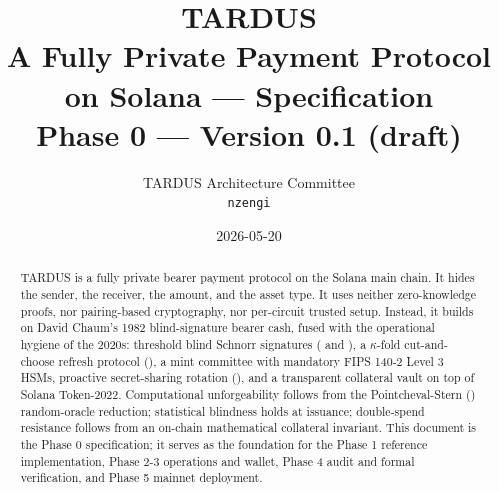 \documentclass[11pt,letterpaper]{article}
\title{
  \vspace{-2em}
  \Huge\textbf{TARDUS} \\[0.8em]
  \Large A Fully Private Payment Protocol \\[0.3em] on Solana --- Specification \\[1.2em]
  \normalsize Phase 0 --- Version 0.1 (draft)
}
\author{
  TARDUS Architecture Committee \\
  \texttt{nzengi}
}
\date{2026-05-20}
\theoremstyle{definition}
\theoremstyle{remark}
\begin{document}
\maketitle
\thispagestyle{empty}

\begin{abstract}
\noindent
TARDUS is a fully private bearer payment protocol on the Solana main chain. It hides the sender, the receiver, the amount, and the asset type. It uses neither zero-knowledge proofs, nor pairing-based cryptography, nor per-circuit trusted setup. Instead, it builds on David Chaum's 1982 blind-signature bearer cash, fused with the operational hygiene of the 2020s: threshold blind Schnorr signatures (\cite{stinson-strobl2001} and \cite{komlo-goldberg2020}), a $\kappa$-fold cut-and-choose refresh protocol (\cite{dold2019}), a mint committee with mandatory FIPS 140-2 Level 3 HSMs, proactive secret-sharing rotation (\cite{gennaro-jarecki-krawczyk-rabin1999}), and a transparent collateral vault on top of Solana Token-2022. Computational unforgeability follows from the Pointcheval-Stern (\cite{pointcheval-stern1996}) random-oracle reduction; statistical blindness holds at issuance; double-spend resistance follows from an on-chain mathematical collateral invariant. This document is the Phase 0 specification; it serves as the foundation for the Phase 1 reference implementation, Phase 2-3 operations and wallet, Phase 4 audit and formal verification, and Phase 5 mainnet deployment.
\end{abstract}

\vspace{1em}

\begin{center}
\end{center}

\vspace{1em}

\tableofcontents

\newpage













\newpage

\end{document}
